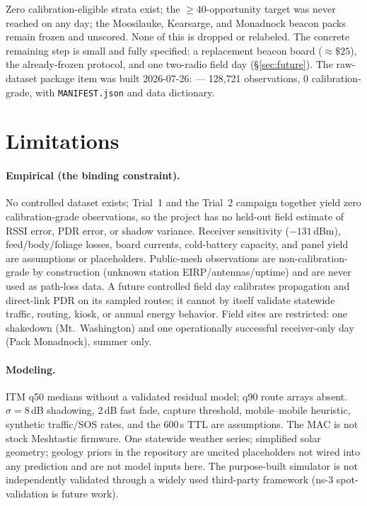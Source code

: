 \documentclass[11pt]{article}
\newcommand{\code}[1]{\texttt{\small #1}}
\begin{document}
Zero calibration-eligible strata exist; the ${\geq}40$-opportunity target was
never reached on any day; the Moosilauke, Kearsarge, and Monadnock beacon
packs remain frozen and unscored. None of this is dropped or relabeled. The
concrete remaining step is small and fully specified: a replacement beacon
board (${\approx}\$25$), the already-frozen protocol, and one two-radio field day (\S\ref{sec:future}). The raw-dataset package item was built 2026-07-26:  --- 128{,}721 observations, 0 calibration-grade, with \code{MANIFEST.json} and data dictionary.

\section{Limitations}\label{sec:limits}

\paragraph{Empirical (the binding constraint).} No controlled dataset exists;
Trial~1 and the Trial~2 campaign together yield zero calibration-grade
observations, so the project has no held-out field estimate of RSSI error,
PDR error, or shadow variance. Receiver sensitivity ($-131$\,dBm),
feed/body/foliage losses, board currents, cold-battery capacity, and panel
yield are assumptions or placeholders. Public-mesh observations are
non-calibration-grade by construction (unknown station EIRP/antennas/uptime)
and are never used as path-loss data. A future controlled field day
calibrates propagation and direct-link PDR on its sampled routes; it cannot
by itself validate statewide traffic, routing, kiosk, or annual energy
behavior. Field sites are restricted: one shakedown (Mt.~Washington) and one
operationally successful receiver-only day (Pack Monadnock), summer only.

\paragraph{Modeling.} ITM q50 medians without a validated residual model; q90
route arrays absent. $\sigma = 8$\,dB shadowing, 2\,dB fast fade, capture
threshold, mobile--mobile heuristic, synthetic traffic/SOS rates, and the
600\,s TTL are assumptions. The MAC is not stock Meshtastic firmware. One
statewide weather series; simplified solar geometry; geology priors in the
repository are uncited placeholders not wired into any prediction and are not
model inputs here. The purpose-built simulator is not independently validated
through a widely used third-party framework (ns-3 spot-validation is future
work).
\end{document}
